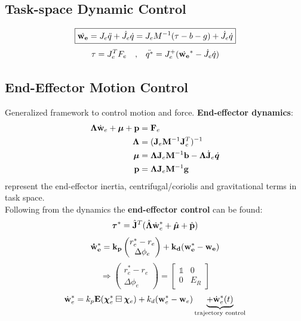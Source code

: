 \documentclass[a4paper, 8pt]{extarticle}
\begin{document}
\begin{multicols*}{3}
\newpage
\subsection{Task-space Dynamic Control}
$$\boxed{\dot{\bf w_{e}}
 =J_{e} \ddot{q} + \dot{J_{e}} \dot{q}=J_{e}M^{-1}(\tau - b -g)+\dot{J_{e}} \dot{q}}$$
 $$ \tau = J_{e}^{T}F_{e} \quad \textrm{,} \quad \ddot{q^*} = J_{e}^+ (\dot{\bf w_{e}}^* - \dot{J_{e}} \dot{{q}})$$ 
\subsection*{End-Effector Motion Control}
Generalized framework to control motion and force. \textbf{End-effector dynamics}:
\begin{align*}
\bm\Lambda \dot{\bf w}_e + \bm\mu + {\bf p} &= {\bf F}_e  \\
\bm\Lambda &= ({\bf J}_e{\bf M}^{-1}{\bf J}_e^T)^{-1} \\
\bm\mu     &= {\bm\Lambda}{\bf J}_e{\bf M}^{-1}{\bf b} - {\bm\Lambda}\dot{\bf J}_e\dot{\bm q} \\
{\bf p}    &= {\bm\Lambda}{\bf J}_e{\bf M}^{-1}{\bf g} \\
\end{align*}
represent the end-effector inertia, centrifugal/coriolis and gravitational terms in task space.\\
Following from the dynamics the \textbf{end-effector control} can be found:
$$\bm\tau^* = \hat{\bf J}^T(\hat{\bm\Lambda} \dot{\bf w}_e^* + \hat{\bm\mu} + \hat{\bf p})$$
$$\bf \dot{w}_{e}^* =k_{p}\begin{pmatrix} r_{e}^* -r_{e}\\ \Delta \phi_{e}\end{pmatrix}+k_{d}(w_{e}^* - w_{e})$$
$$ \Rightarrow \begin{pmatrix} r_{e}^* -r_{e}\\ \Delta \phi_{e}\end{pmatrix} =\begin{bmatrix}
\mathbb{1} & 0 \\ 0 & E_{R} \end{bmatrix}$$
$$\dot{\bf w}_e^* = k_p{\bf E}(\bm\chi^*_e \boxminus \bm\chi_e) + k_d({\bf w}_e^* - {\bf w}_e) \underbrace{+ \dot{\bf w}_e^*(t)}_\text{trajectory control} $$


\end{multicols*}
\end{document}
